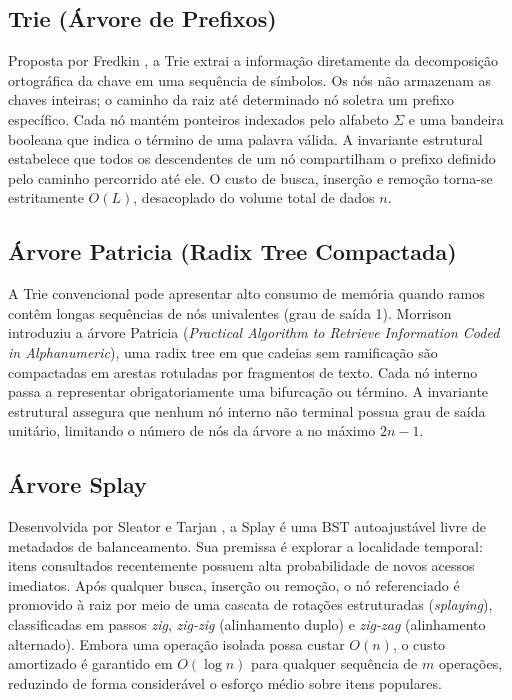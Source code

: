 \documentclass[11pt,a4paper]{article}
\newcommand{\Ogrande}[1]{\ensuremath{O\!\left(#1\right)}}
\begin{document}
\subsection{Trie (Árvore de Prefixos)}
Proposta por Fredkin \cite{fredkin1960}, a Trie extrai a informação diretamente da decomposição ortográfica da chave em uma sequência de símbolos. Os nós não armazenam as chaves inteiras; o caminho da raiz até determinado nó soletra um prefixo específico. Cada nó mantém ponteiros indexados pelo alfabeto $\Sigma$ e uma bandeira booleana que indica o término de uma palavra válida. A invariante estrutural estabelece que todos os descendentes de um nó compartilham o prefixo definido pelo caminho percorrido até ele. O custo de busca, inserção e remoção torna-se estritamente $\Ogrande{L}$, desacoplado do volume total de dados $n$.

\subsection{Árvore Patricia (Radix Tree Compactada)}
A Trie convencional pode apresentar alto consumo de memória quando ramos contêm longas sequências de nós univalentes (grau de saída 1). Morrison \cite{morrison1968} introduziu a árvore Patricia (\textit{Practical Algorithm to Retrieve Information Coded in Alphanumeric}), uma radix tree em que cadeias sem ramificação são compactadas em arestas rotuladas por fragmentos de texto. Cada nó interno passa a representar obrigatoriamente uma bifurcação ou término. A invariante estrutural assegura que nenhum nó interno não terminal possua grau de saída unitário, limitando o número de nós da árvore a no máximo $2n-1$.

\subsection{Árvore Splay}
Desenvolvida por Sleator e Tarjan \cite{sleator1985}, a Splay é uma BST autoajustável livre de metadados de balanceamento. Sua premissa é explorar a localidade temporal: itens consultados recentemente possuem alta probabilidade de novos acessos imediatos. Após qualquer busca, inserção ou remoção, o nó referenciado é promovido à raiz por meio de uma cascata de rotações estruturadas (\textit{splaying}), classificadas em passos \textit{zig}, \textit{zig-zig} (alinhamento duplo) e \textit{zig-zag} (alinhamento alternado). Embora uma operação isolada possa custar $\Ogrande{n}$, o custo amortizado é garantido em $\Ogrande{\log n}$ para qualquer sequência de $m$ operações, reduzindo de forma considerável o esforço médio sobre itens populares.
\end{document}
